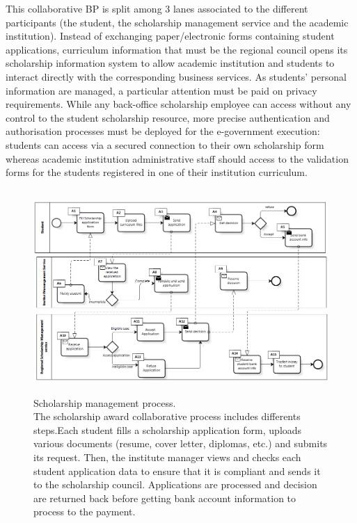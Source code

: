 \documentclass[runningheads,a4paper]{llncs}
\begin{document}
This collaborative BP is split among 3 lanes associated to the different participants (the student, the scholarship management service and the academic institution). Instead of exchanging paper/electronic forms containing student applications, curriculum information that must be the regional council opens its scholarship information system to allow academic institution and students to interact directly with the corresponding business services. As students' personal information are managed, a particular attention must be paid on privacy requirements. While any back-office scholarship employee can access without any control to the student scholarship resource, more precise authentication and authorisation processes must be deployed for the e-government execution: students can access via a secured connection to their own scholarship form whereas academic institution administrative staff should access to the validation forms for the students registered in one of their institution curriculum.

\begin{figure}
\centering
\includegraphics[height=220pt, width=\linewidth]{scholarshipBP.png}
\caption[Scholarship management process]{Scholarship management process.\\ The scholarship award collaborative process includes differents steps.Each student fills a scholarship application form, uploads various documents (resume, cover letter, diplomas, etc.) and submits its request. Then, the institute manager views and checks each student application data to ensure that it is compliant and sends it to the scholarship council. Applications are processed and decision are returned back before getting bank account information to process to the payment.}
\label{fig:bp}
\end{figure}
\end{document}
